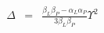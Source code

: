 \begin{eqnarray*}
  \Delta &=& \frac{\beta_{L} \beta_{P} - \alpha_{L} \alpha_{P}}{3\beta_{L} \beta_{P}} \varUpsilon^{2}
\end{eqnarray*}
